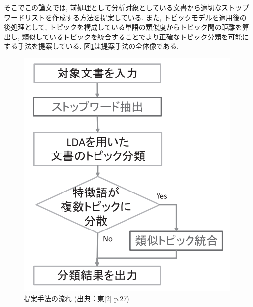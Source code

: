 \documentclass{ltjarticle}
\begin{document}
そこでこの論文では, 前処理として分析対象としている文書から適切なストップワードリストを作成する方法を提案している. 
また, トピックモデルを適用後の後処理として, トピックを構成している単語の類似度からトピック間の距離を算出し, 
類似しているトピックを統合することでより正確なトピック分類を可能にする手法を提案している. 図\ref{fig:関連研究2提案手法}は提案手法の全体像である. 
\begin{figure}[h]
    \centering
    \includegraphics[]{images/fig2.png}
    \caption{提案手法の流れ (出典：東[2] p.27)}
    \label{fig:関連研究2提案手法}
\end{figure}
\end{document}
